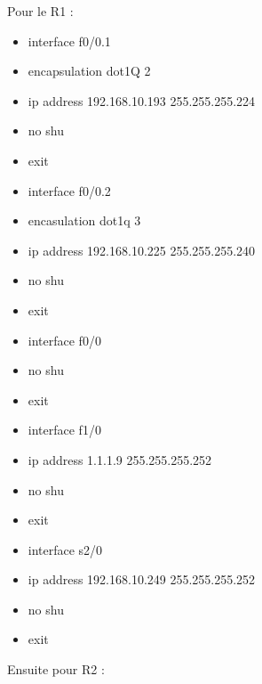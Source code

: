 \documentclass[a4paper,10pt,final,fleqn]{article}
\begin{document}
	Pour le R1 : \\

	\begin{itemize}
		\item interface f0/0.1
		\item encapsulation dot1Q 2
		\item ip address 192.168.10.193 255.255.255.224
		\item no shu
		\item exit
		\item interface f0/0.2
		\item encasulation dot1q 3
		\item ip address 192.168.10.225 255.255.255.240
		\item no shu
		\item exit
		\item interface f0/0
		\item no shu
		\item exit\\
		\item interface f1/0
		\item ip address 1.1.1.9 255.255.255.252
		\item no shu
		\item exit
		\item interface s2/0
		\item ip address 192.168.10.249 255.255.255.252
		\item no shu
		\item exit\\
	\end{itemize}

	Ensuite pour R2 : \\
\end{document}
